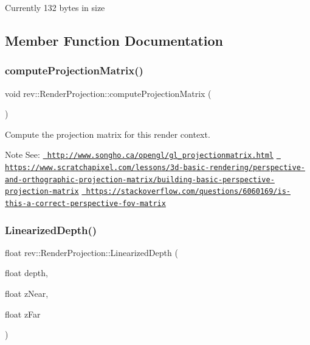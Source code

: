 Currently 132 bytes in size 

\subsection{Member Function Documentation}
\mbox{\label{classrev_1_1_render_projection_a809aadf6b38d1568019704f7969ad41b}} 
\subsubsection{\texorpdfstring{computeProjectionMatrix()}{computeProjectionMatrix()}}
{\footnotesize\ttfamily void rev\+::\+Render\+Projection\+::compute\+Projection\+Matrix (\begin{DoxyParamCaption}{ }\end{DoxyParamCaption})\hspace{0.3cm}{\ttfamily [protected]}}



Compute the projection matrix for this render context. 

\begin{DoxyNote}{Note}
See\+: \href{http://www.songho.ca/opengl/gl_projectionmatrix.html}{\texttt{ http\+://www.\+songho.\+ca/opengl/gl\+\_\+projectionmatrix.\+html}} \href{https://www.scratchapixel.com/lessons/3d-basic-rendering/perspective-and-orthographic-projection-matrix/building-basic-perspective-projection-matrix}{\texttt{ https\+://www.\+scratchapixel.\+com/lessons/3d-\/basic-\/rendering/perspective-\/and-\/orthographic-\/projection-\/matrix/building-\/basic-\/perspective-\/projection-\/matrix}} \href{https://stackoverflow.com/questions/6060169/is-this-a-correct-perspective-fov-matrix}{\texttt{ https\+://stackoverflow.\+com/questions/6060169/is-\/this-\/a-\/correct-\/perspective-\/fov-\/matrix}} 
\end{DoxyNote}
\mbox{\label{classrev_1_1_render_projection_acc7bba2e911429136f2f5c23d55684bc}} 
\subsubsection{\texorpdfstring{LinearizedDepth()}{LinearizedDepth()}}
{\footnotesize\ttfamily float rev\+::\+Render\+Projection\+::\+Linearized\+Depth (\begin{DoxyParamCaption}\item[{float}]{depth,  }\item[{float}]{z\+Near,  }\item[{float}]{z\+Far }\end{DoxyParamCaption})\hspace{0.3cm}{\ttfamily [static]}}



